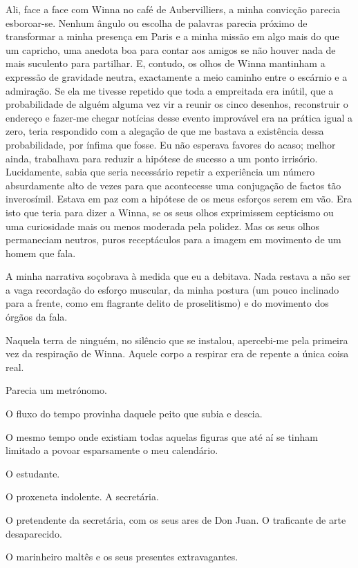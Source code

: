 Ali, face a face com Winna no café de Aubervilliers, a
minha convicção parecia esboroar-se. Nenhum ângulo ou escolha de
palavras parecia próximo de transformar a minha presença em Paris e a
minha missão em algo mais do que um capricho, uma anedota boa para
contar aos amigos se não houver nada de mais suculento para partilhar.
E, contudo, os olhos de Winna mantinham a expressão de gravidade neutra,
exactamente a meio caminho entre o escárnio e a admiração. Se ela me
tivesse repetido que toda a empreitada era inútil, que a probabilidade de alguém alguma vez vir a reunir os cinco
desenhos, reconstruir o endereço e fazer-me chegar notícias desse evento
improvável era na prática igual a zero, teria respondido com a alegação
de que me bastava a existência dessa probabilidade, por ínfima que
fosse. Eu não esperava favores do acaso; melhor ainda, trabalhava para
reduzir a hipótese de sucesso a um ponto irrisório. Lucidamente, sabia
que seria necessário repetir a experiência um número absurdamente alto
de vezes para que acontecesse uma conjugação de factos tão inverosímil.
Estava em paz com a hipótese de os meus esforços serem em vão. Era isto
que teria para dizer a Winna, se os seus olhos exprimissem cepticismo ou
uma curiosidade mais ou menos moderada pela polidez. Mas os seus olhos
permaneciam neutros, puros receptáculos para a imagem em movimento de um
homem que fala.

A minha narrativa soçobrava à medida que eu a debitava. Nada restava a
não ser a vaga recordação do esforço muscular, da minha postura (um
pouco inclinado para a frente, como em flagrante delito de proselitismo)
e do movimento dos órgãos da fala.

Naquela terra de ninguém, no silêncio que se instalou, apercebi-me pela
primeira vez da respiração de Winna. Aquele
corpo a respirar era de repente a única coisa real.

Parecia um metrónomo.

O fluxo do tempo provinha daquele peito que subia e descia.

O mesmo tempo onde existiam todas aquelas figuras que até aí se tinham
limitado a povoar esparsamente o meu calendário.

O estudante.

O proxeneta indolente. A secretária.

O pretendente da secretária, com os seus ares de Don Juan. O traficante
de arte desaparecido.

O marinheiro maltês e os seus presentes extravagantes.

